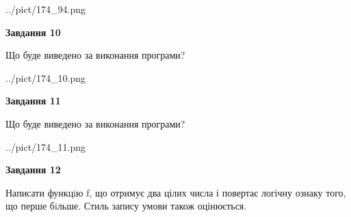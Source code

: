 \documentclass[12pt, ukrainian]{article}
\begin{document}
{\begin {large}
\begin{center}
	{../pict/174_94.png}
\end{center}
\newpage

{\begin {center}\textbf{Завдання 10}\end {center}}

Що буде виведено за виконання програми?\par
\begin{center}
	{../pict/174_10.png}
\end{center}
\newpage

{\begin {center}\textbf{Завдання 11}\end {center}}

Що буде виведено за виконання програми?\par
\begin{center}
	{../pict/174_11.png}
\end{center}
\newpage

{\begin {center}\textbf{Завдання 12}\end {center}}


Написати функцiю f, що отримує два цілих числа і повертає логічну ознаку того, що перше бiльше. Стиль запису умови також оцінюється.\par
\newpage

\end {large}}
\end{document}
